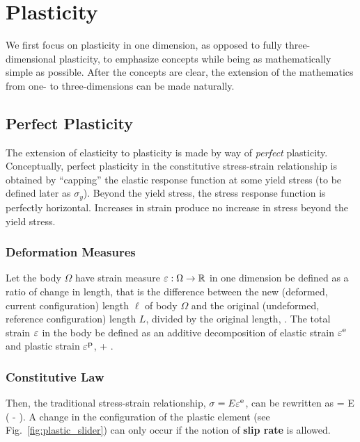 \chapter{Plasticity}

We first focus on plasticity in one dimension, 
as opposed to fully three-dimensional plasticity, 
to emphasize concepts while being
as mathematically simple as possible.  
After the concepts are clear, the extension of the mathematics from
one- to three-dimensions can be made naturally.  

\section{Perfect Plasticity}
The extension of elasticity to plasticity is made by way of 
{\em perfect} plasticity.
Conceptually, perfect plasticity in the constitutive stress-strain 
relationship is obtained by ``capping'' the
elastic response function at some yield stress 
(to be defined later as $\sigma_y$).  Beyond the yield stress, the 
stress response function is perfectly horizontal.  
Increases in strain produce no increase in stress
beyond the yield stress.  


\subsection{Deformation Measures}
Let the body $\Omega$ have strain measure 
$\varepsilon : \Omega \rightarrow \mathbb{R}$ 
in one dimension be defined as a ratio of change in length, that is 
the difference between the new (deformed, current configuration) 
length $\ell$ of body $\Omega$ and the original (undeformed, reference 
configuration) length $L$, divided by the original length, 
\be
 \hstrain {} {}.
 \ee
 The total strain $\varepsilon$ in the body be defined as an 
 additive decomposition of elastic strain $\varepsilon^{\mbox{\footnotesize e}}$ and 
plastic strain $\varepsilon^{\mbox{\footnotesize p}}$, 
\be
 \label{eq:smallStrainAddition}
 \hstrain {} \hstraine + \hstrainp.
\ee


\subsection{Constitutive Law}
Then, the traditional stress-strain relationship, $\sigma = E \varepsilon^{\mbox{\footnotesize e}}$, 
can be rewritten as
\be
 \label{eq:stressStrain}
 \sigma = E \left( \hstrain - \hstrainp \right).
\ee
A change in the configuration of the plastic element 
(see  Fig.~\ref{fig:plastic_slider})
can only occur if the notion of {\bf slip rate} is
allowed.

